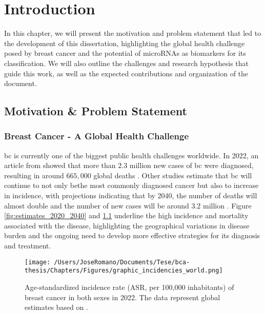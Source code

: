 
%

\chapter{Introduction}
\label{cha:introduction}

In this chapter, we will present the motivation and problem statement that led
to the development of this dissertation, highlighting the global health
challenge posed by breast cancer and the potential of microRNAs as biomarkers
for its classification. We will also outline the challenges and research
hypothesis that guide this work, as well as the expected contributions and
organization of the document.

\section{Motivation \& Problem Statement}
\label{sec:motivation+problem-statement}
\subsection{Breast Cancer - A Global Health Challenge}

\gls{bc} is currently one of the biggest public health challenges worldwide. In
2022, an article from \textcite{bcaData2024_bray} showed that more than $2.3$
million new cases of \gls{bc} were diagnosed, resulting in
around $665,\!000$ global deaths . Other studies
estimate that \gls{bc} will continue to not only bethe most commonly diagnosed
cancer but also to increase in incidence, with projections indicating that by
2040, the number of deaths will almost double and the number of new cases will
be around $3.2$ million \cite{bca_data_Arnold2022Current}. Figure
\ref{fig:estimates_2020_2040} and \ref{fig:graphic_incidencies_world}
underline the high incidence and mortality associated with the disease,
highlighting the geographical variations in disease burden and the ongoing need
to develop more effective strategies for its diagnosis and treatment.

\begin{figure}[h!]
  \centering
  \texttt{[image: /Users/JoseRomano/Documents/Tese/bca-thesis/Chapters/Figures/graphic\_incidencies\_world.png]}
  \caption{Age-standardized incidence rate (ASR, per 100,000 inhabitants) of breast cancer in both sexes in 2022.
    The data represent global estimates based on \textcite{GLOBOCAN2022}.}
  \label{fig:graphic_incidencies_world}
\end{figure}

